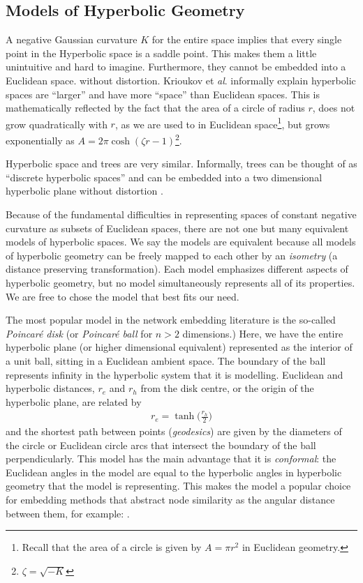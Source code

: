 \documentclass{article}
\begin{document}
\subsection{Models of Hyperbolic Geometry}

A negative Gaussian curvature $K$ for the entire space implies that every single point in the Hyperbolic space is a saddle point.
This makes them a little unintuitive and hard to imagine.
Furthermore, they cannot be embedded into a Euclidean space. without distortion.
Krioukov et \textit{al}. \cite{krioukov2010hyperbolic} informally explain hyperbolic spaces are ``larger'' and have more ``space'' than Euclidean spaces.
This is mathematically reflected by the fact that the area of a circle of radius $r$, does not grow quadratically with $r$, as we are used to in Euclidean space\footnote{Recall that the area of a circle is given by $A=\pi r^2$ in Euclidean geometry.}, but grows exponentially as $A=2\pi \cosh(\zeta r - 1)$\footnote{$\zeta = \sqrt{-K}$}.

Hyperbolic space and trees are very similar.
Informally, trees can be thought of as ``discrete hyperbolic spaces'' and can be embedded into a two dimensional hyperbolic plane without distortion \cite{krioukov2010hyperbolic,de2018representation}. 


Because  of  the  fundamental  difficulties  in  representing spaces of constant negative curvature as subsets of Euclidean spaces,  there  are  not  one  but  many  equivalent  models  of hyperbolic spaces. 
We say the models are equivalent because 
all models of hyperbolic geometry can be freely mapped to each other by an \textit{isometry} (a distance preserving transformation).
Each model emphasizes different aspects of hyperbolic geometry, but no model simultaneously represents all of its properties.
We are free to chose the model that best fits our need.

The most popular model in the network embedding literature is the so-called \textit{Poincar\'e disk} (or \textit{Poincar\'e ball} for $n>2$ dimensions.)
Here, we have the entire hyperbolic plane (or higher dimensional equivalent) represented as the interior of a unit ball, sitting in a Euclidean ambient space.
The boundary of the ball represents infinity in the hyperbolic system that it is modelling.
Euclidean and hyperbolic distances, $r_e$ and $r_h$ from  the  disk  centre,  or  the  origin  of  the	hyperbolic plane, are related by
\begin{align*}
r_e =  \tanh\bigg(\frac{r_h}{2}\bigg)
\end{align*}
and the shortest path between points (\textit{geodesics}) are given by the diameters of the circle or Euclidean circle arcs that intersect the boundary of the ball perpendicularly.
This model has the main advantage that it is \textit{conformal}: the Euclidean angles in the model are equal to the hyperbolic angles in hyperbolic geometry that the model is representing.
This makes the model a popular choice for embedding methods that abstract node similarity as the angular distance between them, for example: \cite{alanis2016efficient,alanis2016manifold}.
\end{document}
